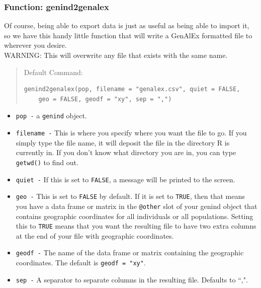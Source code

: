 \documentclass[letterpaper]{article}\usepackage[]{graphicx}\usepackage[]{color}
\makeatletter
\newenvironment{kframe}{%
 \def\at@end@of@kframe{}%
 \ifinner\ifhmode%
  \def\at@end@of@kframe{\end{minipage}}%
  \begin{minipage}{\columnwidth}%
 \fi\fi%
 \def\FrameCommand##1{\hskip\@totalleftmargin \hskip-\fboxsep
 \colorbox{shadecolor}{##1}\hskip-\fboxsep
     \hskip-\linewidth \hskip-\@totalleftmargin \hskip\columnwidth}%
 \MakeFramed {\advance\hsize-\width
   \@totalleftmargin\z@ \linewidth\hsize
   \@setminipage}}%
 {\par\unskip\endMakeFramed%
 \at@end@of@kframe}
\newenvironment{knitrout}{}{} %
\newcommand{\tab}{\hspace*{1em}}
\makeatother
\begin{document}
\subsubsection{Function: genind2genalex}\label{intro:import:genind2genalex}

\tab\tab Of course, being able to export data is just as useful as being able to import it, so we have this handy little function that will write a GenAlEx formatted file to wherever you desire.\\ 
WARNING: This will overwrite any file that exists with the same name.
\begin{quote}
Default Command:
\begin{knitrout}
\color{fgcolor}\begin{kframe}
\begin{verbatim}
genind2genalex(pop, filename = "genalex.csv", quiet = FALSE, 
    geo = FALSE, geodf = "xy", sep = ",")
\end{verbatim}
\end{kframe}
\end{knitrout}

\end{quote}
\begin{itemize}
  \item \texttt{pop -} a \texttt{genind} object.
  \item \texttt{filename -} This is where you specify where you want the file to go. If you simply type the file name, it will deposit the file in the directory R is currently in. If you don't know what directory you are in, you can type \texttt{getwd()} to find out.
  \item \texttt{quiet -} If this is set to \texttt{FALSE}, a message will be printed to the screen.
  \item \texttt{geo -} This is set to \texttt{FALSE} by default. If it is set to \texttt{TRUE}, then that means you have a data frame or matrix in the \texttt{@other} slot of your genind object that contains geographic coordinates for all individuals or all populations. Setting this to \texttt{TRUE} means that you want the resulting file to have two extra columns at the end of your file with geographic coordinates.
  \item \texttt{geodf -} The name of the data frame or matrix containing the geographic coordinates. The default is \texttt{geodf = "xy"}.
  \item \texttt{sep -} A separator to separate columns in the resulting file.
  Defaults to ``,".
\end{itemize}
\end{document}

